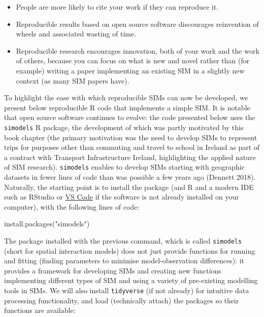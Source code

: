 \documentclass[11pt,letterpaper]{article}
\newenvironment{Shaded}{\begin{snugshade}}{\end{snugshade}}
\newcommand{\FunctionTok}[1]{\textcolor[rgb]{0.00,0.00,0.00}{#1}}
\newcommand{\NormalTok}[1]{#1}
\newcommand{\StringTok}[1]{\textcolor[rgb]{0.31,0.60,0.02}{#1}}
\begin{document}
\begin{itemize}
\item
  People are more likely to cite your work if they can reproduce it.
\item
  Reproducible results based on open source software discourages reinvention of wheels and associated wasting of time.
\item
  Reproducible research encourages innovation, both of your work and the work of others, because you can focus on what is new and novel rather than (for example) writing a paper implementing an existing SIM in a slightly new context (as many SIM papers have).
\end{itemize}

To highlight the ease with which reproducible SIMs can now be developed, we present below reproducible R code that implements a simple SIM.
It is notable that open source software continues to evolve: the code presented below uses the \texttt{simodels} R package, the development of which was partly motivated by this book chapter (the primary motivation was the need to develop SIMs to represent trips for purposes other than commuting and travel to school in Ireland as part of a contract with Transport Infrastructure Ireland, highlighting the applied nature of SIM research).
\texttt{simodels} enables to develop SIMs starting with geographic datasets in fewer lines of code than was possible a few years ago (Dennett 2018).
Naturally, the starting point is to install the package (and R and a modern IDE such as RStudio or \href{https://marketplace.visualstudio.com/items?itemName=REditorSupport.r}{VS Code} if the software is not already installed on your computer), with the following lines of code:

\begin{Shaded}
\begin{Highlighting}[]
\FunctionTok{install.packages}\NormalTok{(}\StringTok{"simodels"}\NormalTok{)}
\end{Highlighting}
\end{Shaded}

The package installed with the previous command, which is called \texttt{simodels} (short for spatial interaction models) does not just provide functions for running and fitting (finding parameters to minimise model-observation differences): it provides a framework for developing SIMs and creating new functions implementing different types of SIM and using a variety of pre-existing modelling tools in SIMs.
We will also install \texttt{tidyverse} (if not already) for intuitive data processing functionality, and load (technically attach) the packages so their functions are available:
\end{document}
